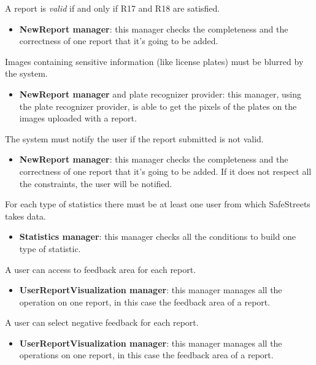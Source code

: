 \documentclass[../RASD.tex]{subfiles}
\begin{document}
\begin{enumerate}
         A report is \textit{valid} if and only if R17 and R18 are satisfied.
        \begin{itemize}
            \item \textbf{NewReport manager}: this manager checks the completeness and the correctness of one report that it’s going to be added.
        \end{itemize}

         Images containing sensitive information (like license plates) must be blurred by the system.
        \begin{itemize}
            \item \textbf{NewReport manager} and plate recognizer provider: this manager, using the plate recognizer provider,
            is able to get the pixels of the plates on the images uploaded with a report.
        \end{itemize}

         The system must notify the user if the report submitted is not valid.
        \begin{itemize}
            \item \textbf{NewReport manager}: this manager checks the completeness and the correctness of one report that it’s going to be added.
            If it does not respect all the constraints, the user will be notified.
        \end{itemize}

         For each type of statistics there must be at least one user from which SafeStreets takes data.
        \begin{itemize}
            \item \textbf{Statistics manager}: this manager checks all the conditions to build one type of statistic.
        \end{itemize}

         A user can access to feedback area for each report.
        \begin{itemize}
            \item \textbf{UserReportVisualization manager}: this manager manages all the operation on one report, in this case the feedback area of a report.
        \end{itemize}

         A user can select negative feedback for each report.
        \begin{itemize}
            \item \textbf{UserReportVisualization manager}: this manager manages all the operations on one report, in this case the feedback area of a report.
        \end{itemize}


\end{enumerate}
\end{document}
